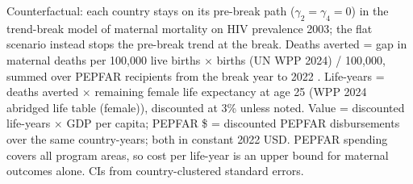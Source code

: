 \begin{table}[htbp]
\begin{minipage}{\textwidth}\footnotesize Counterfactual: each country stays on its pre-break path ($\gamma_2 = \gamma_4 = 0$) in the trend-break model of maternal mortality on HIV prevalence 2003; the flat scenario instead stops the pre-break trend at the break. Deaths averted = gap in maternal deaths per 100,000 live births $\times$ births (UN WPP 2024) / 100,000, summed over PEPFAR recipients from the break year to 2022 . Life-years = deaths averted $\times$ remaining female life expectancy at age 25 (WPP 2024 abridged life table (female)), discounted at 3\% unless noted. Value = discounted life-years $\times$ GDP per capita; PEPFAR \$ = discounted PEPFAR disbursements over the same country-years; both in constant 2022 USD. PEPFAR spending covers all program areas, so cost per life-year is an upper bound for maternal outcomes alone. CIs from country-clustered standard errors.\end{minipage}
\end{table}
